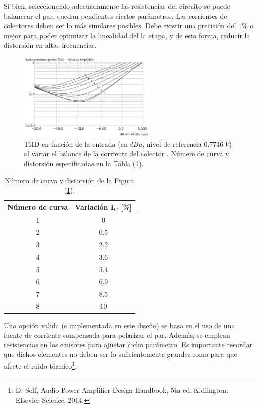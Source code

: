Si bien, seleccionando adecuadamente las resistencias del circuito se puede balancear el par, quedan pendientes ciertos parámetros. Las corrientes de colectores deben ser lo más similares posibles. Debe existir una precisión del $1\%$ o mejor para poder optimizar la linealidad del la etapa, y de esta forma, reducir la distorsión en altas frecuencias.
\begin{figure}[H]
\centering
	\includegraphics[width=0.6\textwidth]{ImagenesInput-Stage/thd2.PNG}
	\caption{THD en función de la entrada (en $dBu$, nivel de referencia $0.7746 \ V$) al variar el balance de la corriente del colector . Número de curva y distorsión especificadas en la Tabla (\ref{tab:thd2}).}
	\label{fig:thd2}
\end{figure}

\begin{table}[H]
\centering
\begin{tabular}{cc}
\hline
\textbf{Número de curva} & \textbf{Variación $\mathbf{I_C}$ [\%]} \\ \hline
1                        & 0                    \\
2                        & 0.5                  \\
3                        & 2.2                  \\
4                        & 3.6                  \\
5                        & 5.4                  \\
6                        & 6.9                  \\
7                        & 8.5                  \\
8                        & 10             		\\
\hline
\end{tabular}
\caption{Número de curva y distorsión de la Figura (\ref{fig:thd2}).}
\label{tab:thd2}
\end{table}

Una opción valida (e implementada en este diseño) se basa en el uso de una fuente de corriente compensada para polarizar el par. Además, se emplean resistencias en los emisores para ajustar dicho parámetro. Es importante recordar que dichos elementos no deben ser lo suficientemente grandes como para que afecte el ruido térmico\footnote{D. Self, Audio Power Amplifier Design Handbook, 5ta ed. Kidlington: Elsevier Science, 2014.}.  

